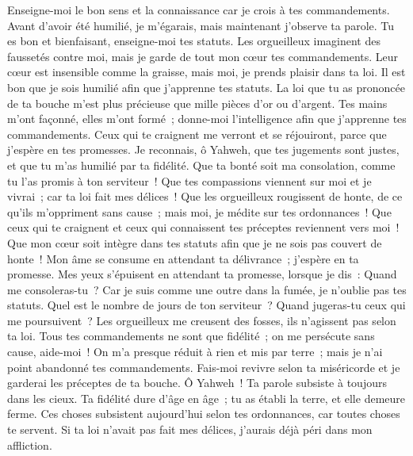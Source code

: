 \begin{multicols}{2}
Enseigne-moi le bon sens et la connaissance car je crois à tes commandements.
Avant d'avoir été humilié, je m'égarais, mais maintenant j'observe ta parole.
Tu es bon et bienfaisant, enseigne-moi tes statuts.
Les orgueilleux imaginent des faussetés contre moi, mais je garde de tout mon cœur tes commandements.
Leur cœur est insensible comme la graisse, mais moi, je prends plaisir dans ta loi.
Il est bon que je sois humilié afin que j'apprenne tes statuts.
La loi que tu as prononcée de ta bouche m'est plus précieuse que mille pièces d'or ou d'argent.
 Tes mains m'ont façonné, elles m'ont formé~; donne-moi l'intelligence afin que j'apprenne tes commandements.
Ceux qui te craignent me verront et se réjouiront, parce que j'espère en tes promesses.
Je reconnais, ô Yahweh, que tes jugements sont justes, et que tu m'as humilié par ta fidélité.
Que ta bonté soit ma consolation, comme tu l'as promis à ton serviteur~!
Que tes compassions viennent sur moi et je vivrai~; car ta loi fait mes délices~!
Que les orgueilleux rougissent de honte, de ce qu'ils m'oppriment sans cause~; mais moi, je médite sur tes ordonnances~!
Que ceux qui te craignent et ceux qui connaissent tes préceptes reviennent vers moi~!
Que mon cœur soit intègre dans tes statuts afin que je ne sois pas couvert de honte~!
 Mon âme se consume en attendant ta délivrance~; j'espère en ta promesse.
Mes yeux s'épuisent en attendant ta promesse, lorsque je dis~: Quand me consoleras-tu~?
Car je suis comme une outre dans la fumée, je n'oublie pas tes statuts.
Quel est le nombre de jours de ton serviteur~? Quand jugeras-tu ceux qui me poursuivent~?
Les orgueilleux me creusent des fosses, ils n'agissent pas selon ta loi.
Tous tes commandements ne sont que fidélité~; on me persécute sans cause, aide-moi~!
On m'a presque réduit à rien et mis par terre~; mais je n'ai point abandonné tes commandements.
Fais-moi revivre selon ta miséricorde et je garderai les préceptes de ta bouche.
 Ô Yahweh~! Ta parole subsiste à toujours dans les cieux.
Ta fidélité dure d'âge en âge~; tu as établi la terre, et elle demeure ferme.
Ces choses subsistent aujourd'hui selon tes ordonnances, car toutes choses te servent.
Si ta loi n'avait pas fait mes délices, j'aurais déjà péri dans mon affliction.

\end{multicols}
